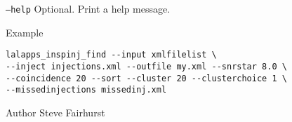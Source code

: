 \begin{entry}
\begin{entry}
\item[\texttt{--help}] Optional.  Print a help message.
\end{entry}

\item[Example]
\begin{verbatim}
lalapps_inspinj_find --input xmlfilelist \
--inject injections.xml --outfile my.xml --snrstar 8.0 \
--coincidence 20 --sort --cluster 20 --clusterchoice 1 \
--missedinjections missedinj.xml
\end{verbatim}

\item[Author] 
Steve Fairhurst
\end{entry}
\clearpage


